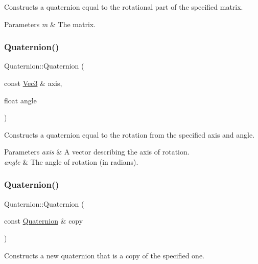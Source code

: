Constructs a quaternion equal to the rotational part of the specified matrix.


\begin{DoxyParams}{Parameters}
{\em m} & The matrix. \\
\hline
\end{DoxyParams}
\mbox{\label{classQuaternion_a58c28df43d7a0624734db4635cb98182}} 
\subsubsection{\texorpdfstring{Quaternion()}{Quaternion()}\hspace{0.1cm}{\footnotesize\ttfamily [11/12]}}
{\footnotesize\ttfamily Quaternion\+::\+Quaternion (\begin{DoxyParamCaption}\item[{const \hyperlink{classVec3}{Vec3} \&}]{axis,  }\item[{float}]{angle }\end{DoxyParamCaption})}

Constructs a quaternion equal to the rotation from the specified axis and angle.


\begin{DoxyParams}{Parameters}
{\em axis} & A vector describing the axis of rotation. \\
\hline
{\em angle} & The angle of rotation (in radians). \\
\hline
\end{DoxyParams}
\mbox{\label{classQuaternion_aea3b87270ed824acf7250b2a94c4af8d}} 
\subsubsection{\texorpdfstring{Quaternion()}{Quaternion()}\hspace{0.1cm}{\footnotesize\ttfamily [12/12]}}
{\footnotesize\ttfamily Quaternion\+::\+Quaternion (\begin{DoxyParamCaption}\item[{const \hyperlink{classQuaternion}{Quaternion} \&}]{copy }\end{DoxyParamCaption})}

Constructs a new quaternion that is a copy of the specified one.


